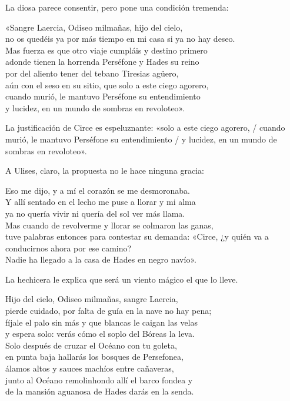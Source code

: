 La diosa parece consentir, pero pone una condición tremenda:

\begin{versocita}
«Sangre Laercia, Odiseo milmañas, hijo del cielo,\\
no os quedéis ya por más tiempo en mi casa si ya no hay deseo.\\
Mas fuerza es que otro viaje cumpláis y destino primero\\
adonde tienen la horrenda Perséfone y Hades su reino\\
por del aliento tener del tebano Tiresias agüero,\\
aún con el seso en su sitio, que solo a este ciego agorero,\\
cuando murió, le mantuvo Perséfone su entendimiento\\
y lucidez, en un mundo de sombras en revoloteo».
\end{versocita}

La justificación de Circe es espeluznante: «solo a este ciego agorero, / cuando murió, le mantuvo Perséfone su entendimiento / y lucidez, en un mundo de sombras en revoloteo».

A Ulises, claro, la propuesta no le hace ninguna gracia:

\begin{versocita}
Eso me dijo, y a mí el corazón se me desmoronaba.\\
Y allí sentado en el lecho me puse a llorar y mi alma\\
ya no quería vivir ni quería del sol ver más llama.\\
Mas cuando de revolverme y llorar se colmaron las ganas,\\
tuve palabras entonces para contestar su demanda:
\stanzabreak
«Circe, ¿y quién va a conducirnos ahora por ese camino?\\
Nadie ha llegado a la casa de Hades en negro navío».
\end{versocita}

La hechicera le explica que será un viento mágico el que lo lleve.

\begin{versocita}
Hijo del cielo, Odiseo milmañas, sangre Laercia,\\
pierde cuidado, por falta de guía en la nave no hay pena;\\
fíjale el palo sin más y que blancas le caigan las velas\\
y espera solo: verás cómo el soplo del Bóreas la leva.\\
Solo después de cruzar el Océano con tu goleta,\\
en punta baja hallarás los bosques de Persefonea,\\
álamos altos y sauces machíos entre cañaveras,\\
junto al Océano remolinhondo allí el barco fondea y\\
de la mansión aguanosa de Hades darás en la senda.
\end{versocita}

